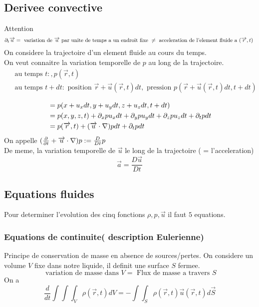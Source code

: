 \documentclass[../main.tex]{subfiles}
\begin{document}
\subsection{Derivee convective}
Attention
\[ 
	\partial_t \overrightarrow{u} = \text{ variation de $\overrightarrow{u}$ par unite de temps a un endroit fixe } \neq \text{ acceleration de l'element fluide a $(\overrightarrow{r},t )$ } 
\]
On considere la trajectoire d'un element fluide au cours du temps.\\
On veut connaitre la variation temporelle de $p$ au long de la trajectoire.
\begin{align*}
	&\text{ au temps } t: , p( \vec{r},t) \\
	&\text{ au temps  } t+ dt: \text{ position } \vec{r}+ \vec{u}( \vec{r},t) dt, \text{ pression } p( \vec{r}+ \vec{u}( \vec{r},t) dt, t+dt) \\
\end{align*}
\begin{align*}
	&=p( x+u_xdt, y+u_ydt,z+u_z dt, t+dt)\\
	&= p( x,y,z,t) + \partial_x p u_x dt + \partial_y p u_y dt + \partial_z p u_z dt + \partial_t p dt\\
	&= p( \overrightarrow{r},t) + ( \overrightarrow{u}\cdot \nabla)p dt + \partial_t p dt
\end{align*}
On appelle $(  \frac{\partial}{\partial t}+ \overrightarrow{u}\cdot \nabla )p := \frac{D}{Dt}p$\\
De meme, la variation temporelle de $\vec{u}$ le long de la trajectoire ( = l'acceleration) 
\[ 
\vec{a}= \frac{D \vec{u}}{Dt}
\]
\subsection{Equations fluides}
Pour determiner l'evolution des cinq fonctions $\rho, p, \vec{u}$ il faut $5$ equations.
\subsubsection{Equations de continuite( description Eulerienne) }
Principe de conservation de masse en absence de sources/pertes.
On considere un volume $V$ fixe dans notre liquide, il definit une surface $S$ fermee.
\[ 
\text{ variation de masse dans } V = \text{ Flux de masse a travers  } S
\]
On a
\[ 
	\frac{d}{dt} \int \int \int _V \rho( \vec{r},t) dV = -\int \int_S \rho( \vec{r},t) \vec{u}( \vec{r},t) d \vec{S}
\]
\end{document}

